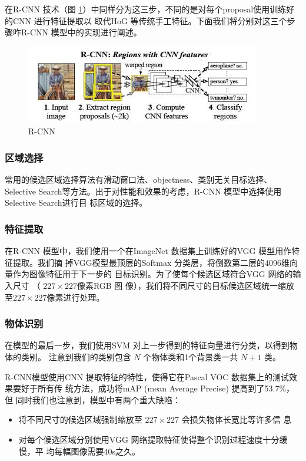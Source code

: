 在R-CNN 技术（图 \ref{Fig:RCNN}）中同样分为这三步，不同的是对每个proposal使用训练好的CNN 进行特征提取以
取代HoG 等传统手工特征。下面我们将分别对这三个步骤咋R-CNN 模型中的实现进行阐述。

\begin{figure}
  \centering
  \includegraphics[width=0.8\linewidth]{./Figure/RCNN.jpg}
  \caption{R-CNN}\label{Fig:RCNN}
\end{figure}

\subsubsection{区域选择}

常用的候选区域选择算法有滑动窗口法、objectness、类别无关目标选择、Selective
Search等方法。出于对性能和效果的考虑，R-CNN 模型中选择使用 Selective Search进行目
标区域的选择。

\subsubsection{特征提取}

在R-CNN 模型中，我们使用一个在ImageNet 数据集上训练好的VGG 模型用作特征提取。我们摘
掉VGG模型最顶层的Softmax 分类层，将倒数第二层的4096维向量作为图像特征用于下一步的
目标识别。为了使每个候选区域符合VGG 网络的输入尺寸 （ $227 \times 227$像素RGB 图
像），我们将不同尺寸的目标候选区域统一缩放至$227 \times 227$像素进行处理。

\subsubsection{物体识别}

在模型的最后一步，我们使用SVM 对上一步得到的特征向量进行分类，以得到物体的类别。
注意到我们的类别包含 $N$ 个物体类和1个背景类一共 $N+1$ 类。

R-CNN模型使用CNN 提取特征的特性，使得它在Pascal VOC 数据集上的测试效果要好于所有传
统方法，成功将mAP (mean Average Precise) 提高到了53.7\%\cite{Girshick:2014jx}，但
同时我们也注意到，模型中有两个重大缺陷：

\begin{itemize}
  \item 将不同尺寸的候选区域强制缩放至 $227 \times 227$ 会损失物体长宽比等许多信
    息
  \item 对每个候选区域分别使用VGG 网络提取特征使得整个识别过程速度十分缓慢，平
     均每幅图像需要40s之久\cite{Girshick:2014jx}。
\end{itemize}


